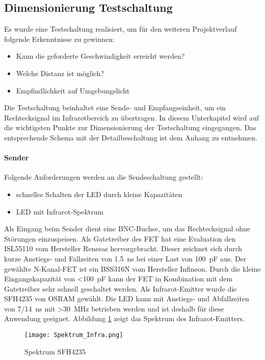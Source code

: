 \subsection{Dimensionierung Testschaltung}
Es wurde eine Testschaltung realisiert, um für den weiteren Projektverlauf folgende Erkenntnisse zu gewinnen:
\begin{itemize}
	\item Kann die geforderte Geschwindigkeit erreicht werden?
	\item Welche Distanz ist möglich?
	\item Empfindlichkeit auf Umgebungslicht 
\end{itemize}
Die Testschaltung beinhaltet eine Sende- und Empfangseinheit, um ein Rechtecksignal im Infrarotbereich zu übertragen. 
In diesem Unterkapitel wird auf die wichtigsten Punkte zur Dimensionierung der Testschaltung eingegangen. Das entsprechende Schema mit der Detailbeschaltung ist dem Anhang zu entnehmen.
\paragraph{Sender} 
Folgende Anforderungen werden an die Sendeschaltung gestellt:
\begin{itemize}
	\item schnelles Schalten der LED durch kleine Kapazitäten
	\item LED mit Infrarot-Spektrum
\end{itemize}
Als Eingang beim Sender dient eine BNC-Buchse, um das Rechtecksignal ohne Störungen einzuspeisen. Als Gatetreiber des FET hat eine Evaluation den ISL55110 vom Hersteller Renesas hervorgebracht. Dieser zeichnet sich durch kurze Anstiegs- und Fallzeiten von \SI{1.5}{ns} bei einer Last von \SI{100}{pF} aus.
Der gewählte N-Kanal-FET ist ein BSS316N vom Hersteller Infineon. Durch die kleine Eingangskapazität von \textless \SI{100}{pF} kann der FET in Kombination mit dem Gatetreiber sehr schnell geschaltet werden.
Als Infrarot-Emitter wurde die SFH4235 von OSRAM gewählt. Die LED kann mit Anstiegs- und Abfallzeiten von 7/\SI{14}{ns} mit \textgreater \SI{30}{MHz} betrieben werden und ist deshalb für diese Anwendung geeignet. Abbildung \ref{fig:Spektrum_Infra} zeigt das Spektrum des Infrarot-Emitters.

\begin{figure}[h]
	\centering
	\texttt{[image: Spektrum\_Infra.png]}
	\caption{Spektrum SFH4235 \cite{sfh4235}}\label{fig:Spektrum_Infra}
\end{figure}

